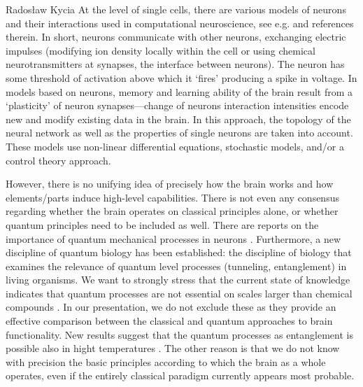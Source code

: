 \begin{artengenv}{Radosław Kycia}
At the level of single cells, there are various models of neurons and their interactions used in computational neuroscience, see e.g. \parencite{ModellingNeurons} and references therein. In short, neurons communicate with other neurons, exchanging electric impulses (modifying ion density locally within the cell or using chemical neurotransmitters at synapses, the interface between neurons). The neuron has some threshold of activation above which it `fires' producing a spike in voltage. In models based on neurons, memory and learning ability of the brain result from a `plasticity' of neuron synapses---change of neurons interaction intensities encode new and modify existing data in the brain. In this approach, the topology of the neural network as well as the properties of single neurons are taken into account. These models use non-linear differential equations, stochastic models, and/or a control theory approach.

However, there is no unifying idea of precisely how the brain works and how elements/parts induce high-level capabilities. There is not even any consensus regarding whether the brain operates on classical principles alone, or whether quantum principles need to be included as well. There are reports on the importance of quantum mechanical processes in neurons  \parencite{EmperorsNewMind, PenroseQuantum1, PenroseQuantum2}. Furthermore, a new discipline of quantum biology \parencite{QuantumBilogy} has been established: the discipline of biology that examines the relevance of quantum level processes (tunneling, entanglement) in living organisms. We want to strongly stress that the current state of knowledge indicates that quantum processes are not essential on scales larger than chemical compounds \parencite{QuantumBilogy}. In our presentation, we do not exclude these as they provide an effective comparison between the classical and quantum approaches to brain functionality. New results suggest that the quantum processes as entanglement is possible also in hight temperatures \parencite{HightTempEntantgelemnt}. The other reason is that we do not know with precision the basic principles according to which the brain as a whole operates, even if the entirely classical paradigm currently appears most probable.



\end{artengenv}
